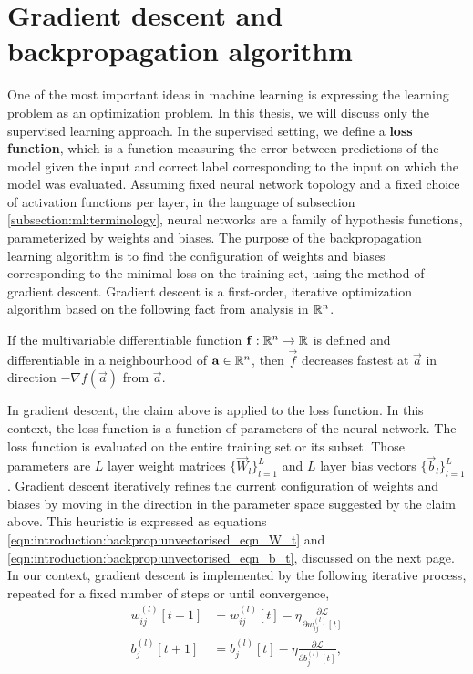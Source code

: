 \section{Gradient descent and backpropagation algorithm}
One of the most important ideas in machine learning is expressing the learning problem as an optimization problem. In this thesis, we will discuss only the supervised learning approach.
In the supervised setting, we define a \textbf{loss function}, which is a function measuring the error between predictions of the model given the input and correct label corresponding to the input on which the model was evaluated. 
Assuming fixed neural network topology and a fixed choice of activation functions per layer, in the language of subsection \ref{subsection:ml:terminology}, neural networks are a family of hypothesis functions, parameterized by weights and biases. The purpose of the backpropagation learning algorithm is to find the configuration of weights and biases corresponding to the minimal loss on the training set, using the method of gradient descent. Gradient descent is a first-order, iterative optimization algorithm based on the following fact from analysis in ${\mathbb R}^n$.
\begin{claim}
If the multivariable differentiable function $\mathbf{f}: {\mathbb R}^n \to {\mathbb R}$ is defined and differentiable in a neighbourhood of $\mathbf{a} \in {\mathbb R}^n$, then $\vec{f}$ decreases fastest at $\vec{a}$ in direction $-\nabla f(\vec{a})$ from $\vec{a}$.
\end{claim}
In gradient descent, the claim above is applied to the loss function. In this context, the loss function is a function of parameters of the neural network. The loss function is evaluated on the entire training set or its subset. Those parameters are $L$ layer weight matrices $\{ \vec{W}_l \}_{l=1}^L$ and $L$ layer bias vectors $\{ \vec{b}_l \}_{l=1}^L$.
Gradient descent iteratively refines the current configuration of weights and biases by moving in the direction in the parameter space suggested by the claim above. This heuristic is expressed as equations \ref{eqn:introduction:backprop:unvectorised_eqn_W_t} and \ref{eqn:introduction:backprop:unvectorised_eqn_b_t}, discussed on the next page.
\newpage
In our context, gradient descent is implemented by the following iterative process, repeated for a fixed number of steps or until convergence,
\begin{subequations}
\begin{align}
    w_{ij}^{(l)} [t + 1] &= w_{ij}^{(l)} [t] - \eta \frac{\partial \mathcal{L} }{\partial w_{ij}^{(l)}[t]} \label{eqn:introduction:backprop:unvectorised_eqn_W_t} \\ 
    b_{j}^{(l)} [t + 1] &= b_{j}^{(l)} [t] - \eta  \frac{\partial \mathcal{L} }{\partial b_{j}^{(l)}[t]}, \label{eqn:introduction:backprop:unvectorised_eqn_b_t} 
\end{align}
\end{subequations}
